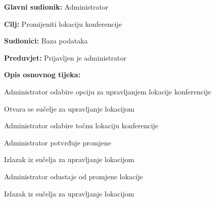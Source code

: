 					\noindent {}
					\begin{packed_item}
						
						\item \textbf{Glavni sudionik: }Administrator
						\item  \textbf{Cilj:} Promijeniti lokaciju konferencije
						\item  \textbf{Sudionici:} Baza podataka
						\item  \textbf{Preduvjet:} Prijavljen je administrator
						\item  \textbf{Opis osnovnog tijeka:}
						
						\item[] \begin{packed_enum}
							
							\item Administrator odabire opciju za upravljanjem lokacije konferencije
							\item Otvara se sučelje za upravljanje lokacijom
							\item Administrator odabire točnu lokaciju konferencije
							\item Administrator potvrđuje promjene
							\item Izlazak iz sučelja za upravljanje lokacijom
						\end{packed_enum}
						
						\item[] \begin{packed_item}
							
							\item[4.a] Administrator odustaje od promjene lokacije
							\item[] \begin{packed_enum}
								
								\item Izlazak iz sučelja za upravljanje lokacijom
								
							\end{packed_enum}
							
						\end{packed_item}
						
					\end{packed_item}
					
